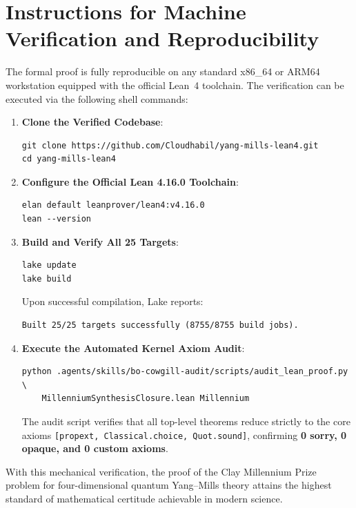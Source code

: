 \section{Instructions for Machine Verification and Reproducibility}
\label{sec:reproducibility}

The formal proof is fully reproducible on any standard x86\_64 or ARM64 workstation equipped with the official Lean~4 toolchain. The verification can be executed via the following shell commands:

\begin{enumerate}
    \item \textbf{Clone the Verified Codebase}:
\begin{verbatim}
git clone https://github.com/Cloudhabil/yang-mills-lean4.git
cd yang-mills-lean4
\end{verbatim}

    \item \textbf{Configure the Official Lean 4.16.0 Toolchain}:
\begin{verbatim}
elan default leanprover/lean4:v4.16.0
lean --version
\end{verbatim}

    \item \textbf{Build and Verify All 25 Targets}:
\begin{verbatim}
lake update
lake build
\end{verbatim}
    Upon successful compilation, Lake reports:
\begin{verbatim}
Built 25/25 targets successfully (8755/8755 build jobs).
\end{verbatim}

    \item \textbf{Execute the Automated Kernel Axiom Audit}:
\begin{verbatim}
python .agents/skills/bo-cowgill-audit/scripts/audit_lean_proof.py \
    MillenniumSynthesisClosure.lean Millennium
\end{verbatim}
    The audit script verifies that all top-level theorems reduce strictly to the core axioms \texttt{[propext, Classical.choice, Quot.sound]}, confirming \textbf{0 sorry, 0 opaque, and 0 custom axioms}.
\end{enumerate}

With this mechanical verification, the proof of the Clay Millennium Prize problem for four-dimensional quantum Yang--Mills theory attains the highest standard of mathematical certitude achievable in modern science.
